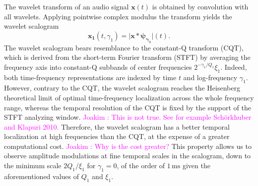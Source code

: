 \documentclass[journal]{IEEEtran}
\newcommand{\ja}[1]{\textcolor{magenta}{Joakim : #1}}
\begin{document}
The wavelet transform of an audio signal
$\boldsymbol{x}(t)$ is obtained by convolution with all wavelets.
Applying pointwise complex modulus the transform yields
the wavelet scalogram
\begin{equation}
\boldsymbol{x_1}(t, \gamma_1)
= \vert \boldsymbol{x} \ast \boldsymbol{\psi_{\gamma_1}} \vert (t)\mbox{.}
\end{equation}
The wavelet scalogram bears resemblance to the constant-Q transform (CQT),
which is derived from the short-term Fourier transform (STFT) by averaging the frequency
axis into constant-Q subbands of center frequencies $2^{-\gamma_1/Q_1}\xi_1$.
Indeed, both time-frequency representations are indexed by time $t$ and log-frequency $\gamma_1$.
However, contrary to the CQT, the wavelet scalogram reaches the Heisenberg
theoretical limit of optimal time-frequency localization across the whole
frequency range, whereas the temporal resolution of the CQT is fixed by the support of the STFT analyzing window. \ja{This is not true. See for example Sch\"orkhuber and Klapuri 2010.}
Therefore, the wavelet scalogram has a better temporal localization at high
frequencies than the CQT, at the expense of a greater computational cost. \ja{Why is the cost greater?}
This property allows us to observe amplitude modulations at fine temporal scales in the scalogram, down to the minimum scale $2Q_1/\xi_1$ for $\gamma_1 = 0$, of the order of $1\,\textrm{ms}$ given the aforementioned values of $Q_1$ and $\xi_1$.
\end{document}
